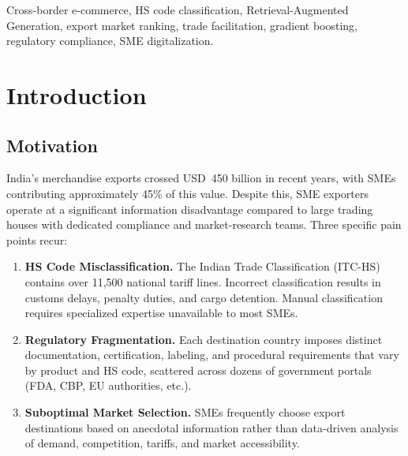 \documentclass[conference]{IEEEtran}
\begin{document}
\begin{IEEEkeywords}
Cross-border e-commerce, HS code classification, Retrieval-Augmented
Generation, export market ranking, trade facilitation, gradient boosting,
regulatory compliance, SME digitalization.
\end{IEEEkeywords}

\section{Introduction}

\subsection{Motivation}
India's merchandise exports crossed USD~450 billion in recent years, with
SMEs contributing approximately 45\% of this value. Despite this, SME
exporters operate at a significant information disadvantage compared to
large trading houses with dedicated compliance and market-research teams.
Three specific pain points recur:

\begin{enumerate}
\item \textbf{HS Code Misclassification.} The Indian Trade Classification
(ITC-HS) contains over 11{,}500 national tariff lines. Incorrect
classification results in customs delays, penalty duties, and cargo
detention. Manual classification requires specialized expertise
unavailable to most SMEs.
\item \textbf{Regulatory Fragmentation.} Each destination country imposes
distinct documentation, certification, labeling, and procedural
requirements that vary by product and HS code, scattered across dozens of
government portals (FDA, CBP, EU authorities, etc.).
\item \textbf{Suboptimal Market Selection.} SMEs frequently choose export
destinations based on anecdotal information rather than data-driven
analysis of demand, competition, tariffs, and market accessibility.
\end{enumerate}
\end{document}
